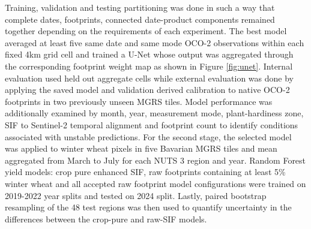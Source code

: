 Training, validation and testing partitioning was done in such a way that complete dates, footprints, connected date-product components remained together depending on the requirements of each experiment. The best model averaged at least five same date and same mode OCO-2 observations within each fixed 4km grid cell and trained a U-Net whose output was aggregated through the corresponding footprint weight map as shown in Figure \ref{fig:unet}. Internal evaluation used held out aggregate cells while external evaluation was done by applying the saved model and validation derived calibration to native OCO-2 footprints in two previously unseen MGRS tiles. Model performance was additionally examined by month, year, measurement mode, plant-hardiness zone, SIF to Sentinel-2 temporal alignment and footprint count to identify conditions associated with unstable predictions. For the second stage, the selected model was applied to winter wheat pixels in five Bavarian MGRS tiles and mean aggregated from March to July for each NUTS 3 region and year. Random Forest yield models: crop pure enhanced SIF, raw footprints containing at least 5\% winter wheat and all accepted raw footprint model configurations were trained on 2019-2022 year splits and tested on 2024 split. Lastly, paired bootstrap resampling of the 48 test regions was then used to quantify uncertainty in the differences between the crop-pure and raw-SIF models. 

